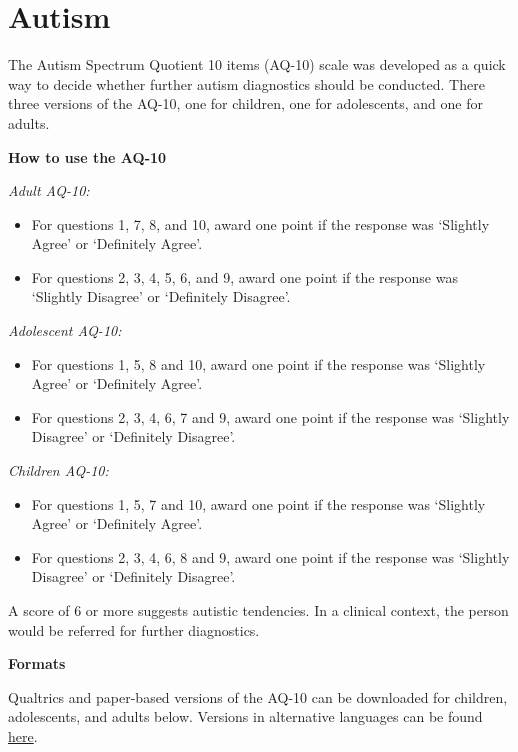 \documentclass[
]{book}
\providecommand{\tightlist}{%
  \setlength{\itemsep}{0pt}\setlength{\parskip}{0pt}}
\begin{document}
\hypertarget{autism}{%
\section{Autism}\label{autism}}

The Autism Spectrum Quotient 10 items (AQ-10) scale was developed as a quick way to decide whether further autism diagnostics should be conducted. There three versions of the AQ-10, one for children, one for adolescents, and one for adults.

\textbf{How to use the AQ-10}

\emph{Adult AQ-10:}

\begin{itemize}
\tightlist
\item
  For questions 1, 7, 8, and 10, award one point if the response was `Slightly Agree' or `Definitely Agree'.
\item
  For questions 2, 3, 4, 5, 6, and 9, award one point if the response was `Slightly Disagree' or `Definitely Disagree'.
\end{itemize}

\emph{Adolescent AQ-10:}

\begin{itemize}
\tightlist
\item
  For questions 1, 5, 8 and 10, award one point if the response was `Slightly Agree' or `Definitely Agree'.
\item
  For questions 2, 3, 4, 6, 7 and 9, award one point if the response was `Slightly Disagree' or `Definitely Disagree'.
\end{itemize}

\emph{Children AQ-10:}

\begin{itemize}
\tightlist
\item
  For questions 1, 5, 7 and 10, award one point if the response was `Slightly Agree' or `Definitely Agree'.
\item
  For questions 2, 3, 4, 6, 8 and 9, award one point if the response was `Slightly Disagree' or `Definitely Disagree'.
\end{itemize}

A score of 6 or more suggests autistic tendencies. In a clinical context, the person would be referred for further diagnostics.

\textbf{Formats}

Qualtrics and paper-based versions of the AQ-10 can be downloaded for children, adolescents, and adults below. Versions in alternative languages can be found \href{https://www.autismresearchcentre.com/arc_tests}{here}.
\end{document}
